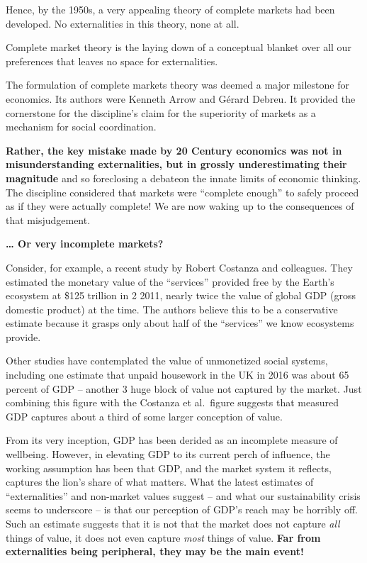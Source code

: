 \documentclass[
]{book}
\begin{document}
Hence, by the 1950s, a very appealing theory of complete markets had been developed. No
externalities in this theory, none at all.

Complete market theory is the laying
down of a conceptual blanket over all our preferences that leaves no space for externalities.

The formulation of complete markets theory was deemed a major milestone for economics. Its authors were Kenneth Arrow and Gérard Debreu.
It provided the cornerstone for the discipline's claim for the
superiority of markets as a mechanism for social coordination.

\textbf{Rather, the key mistake made by 20 Century economics was not in misunderstanding
externalities, but in grossly underestimating their magnitude} and
so foreclosing a debateon the innate limits of economic thinking.
The discipline considered that markets were ``complete enough'' to
safely proceed as if they were actually complete!
We are now waking up to the consequences of that misjudgement.

\textbf{\ldots{} Or very incomplete markets?}

Consider, for example, a recent study by Robert Costanza and colleagues. They estimated
the monetary value of the ``services'' provided free by the Earth's ecosystem at \$125 trillion in
2
2011, nearly twice the value of global GDP (gross domestic product) at the time.
The authors believe this to be a conservative estimate because it grasps only about half of the ``services'' we know ecosystems provide.

Other studies have contemplated the value of unmonetized social systems, including one
estimate that unpaid housework in the UK in 2016 was about 65 percent of GDP -- another
3
huge block of value not captured by the market. Just combining this figure with the Costanza
et al.~figure suggests that measured GDP captures about a third of some larger conception of
value.

From its very inception, GDP has been derided as an incomplete measure of wellbeing.
However, in elevating GDP to its current perch of influence, the working assumption has been
that GDP, and the market system it reflects, captures the lion's share of what matters. What
the latest estimates of ``externalities'' and non-market values suggest -- and what our
sustainability crisis seems to underscore -- is that our perception of GDP's reach may be
horribly off. Such an estimate suggests that it is not that the market does not capture \emph{all} things of value, it does not even capture \emph{most} things of value.
\textbf{Far from externalities being peripheral, they may be the main event!}
\end{document}
